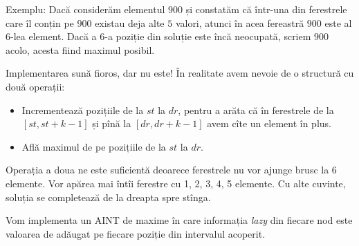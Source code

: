 Exemplu: Dacă considerăm elementul $900$ și constatăm că într-una din ferestrele care îl conțin pe $900$ existau deja alte $5$ valori, atunci în acea fereastră $900$ este al $6$-lea element. Dacă a $6$-a poziție din soluție este încă neocupată, scriem $900$ acolo, acesta fiind maximul posibil.

Implementarea sună fioros, dar nu este! În realitate avem nevoie de o structură cu două operații:

\begin{itemize}
  \item Incrementează pozițiile de la $st$ la $dr$, pentru a arăta că în ferestrele de la $[st, st+k-1]$ și pînă la $[dr, dr + k - 1]$ avem cîte un element în plus.
  \item Află maximul de pe pozițiile de la $st$ la $dr$.
\end{itemize}

Operația a doua ne este suficientă deoarece ferestrele nu vor ajunge brusc la 6 elemente. Vor apărea mai întîi ferestre cu 1, 2, 3, 4, 5 elemente. Cu alte cuvinte, soluția se completează de la dreapta spre stînga.

Vom implementa un AINT de maxime în care informația \textit{lazy} din fiecare nod este valoarea de adăugat pe fiecare poziție din intervalul acoperit.

